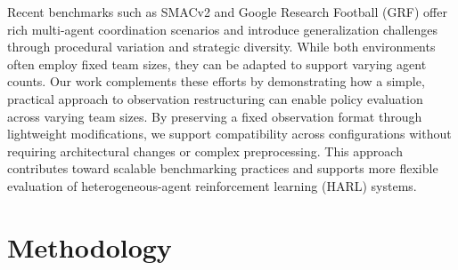 \documentclass{article}
\begin{document}
Recent benchmarks such as SMACv2 \cite{ellis2023} and 
Google Research Football (GRF) \cite{kurach2020} offer rich multi-agent coordination scenarios 
and introduce generalization challenges through procedural variation and strategic diversity. 
While both environments often employ fixed team sizes, 
they can be adapted to support varying agent counts.
Our work complements these efforts by demonstrating how a simple, practical approach to observation 
restructuring can enable policy evaluation across varying team sizes. By preserving a fixed 
observation format through lightweight modifications, we support compatibility across configurations 
without requiring architectural changes or complex preprocessing.
This approach contributes toward scalable benchmarking practices and supports 
more flexible evaluation of heterogeneous-agent reinforcement learning (HARL) systems.


\section{Methodology}



\end{document}
